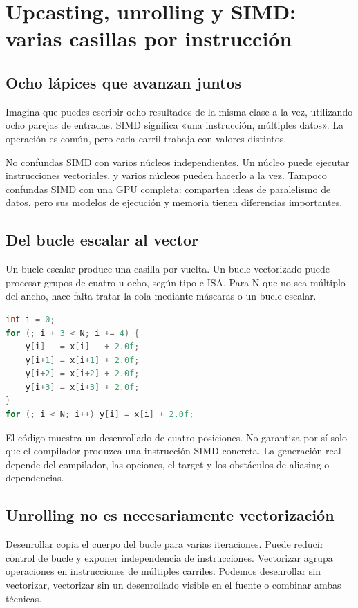 \documentclass[12pt,a4paper,oneside]{report}
\begin{document}
\chapter{Upcasting, unrolling y SIMD: varias casillas por instrucción}
\label{ch:simd}
\section{Ocho lápices que avanzan juntos}
Imagina que puedes escribir ocho resultados de la misma clase a la vez, utilizando ocho parejas de entradas. SIMD significa «una instrucción, múltiples datos». La operación es común, pero cada carril trabaja con valores distintos.

No confundas SIMD con varios núcleos independientes. Un núcleo puede ejecutar instrucciones vectoriales, y varios núcleos pueden hacerlo a la vez. Tampoco confundas SIMD con una GPU completa: comparten ideas de paralelismo de datos, pero sus modelos de ejecución y memoria tienen diferencias importantes.

\section{Del bucle escalar al vector}
Un bucle escalar produce una casilla por vuelta. Un bucle vectorizado puede procesar grupos de cuatro u ocho, según tipo e ISA. Para N que no sea múltiplo del ancho, hace falta tratar la cola mediante máscaras o un bucle escalar.

\begin{lstlisting}[language=C]
int i = 0;
for (; i + 3 < N; i += 4) {
    y[i]   = x[i]   + 2.0f;
    y[i+1] = x[i+1] + 2.0f;
    y[i+2] = x[i+2] + 2.0f;
    y[i+3] = x[i+3] + 2.0f;
}
for (; i < N; i++) y[i] = x[i] + 2.0f;
\end{lstlisting}
El código muestra un desenrollado de cuatro posiciones. No garantiza por sí solo que el compilador produzca una instrucción SIMD concreta. La generación real depende del compilador, las opciones, el target y los obstáculos de aliasing o dependencias.

\section{Unrolling no es necesariamente vectorización}
Desenrollar copia el cuerpo del bucle para varias iteraciones. Puede reducir control de bucle y exponer independencia de instrucciones. Vectorizar agrupa operaciones en instrucciones de múltiples carriles. Podemos desenrollar sin vectorizar, vectorizar sin un desenrollado visible en el fuente o combinar ambas técnicas.
\end{document}
